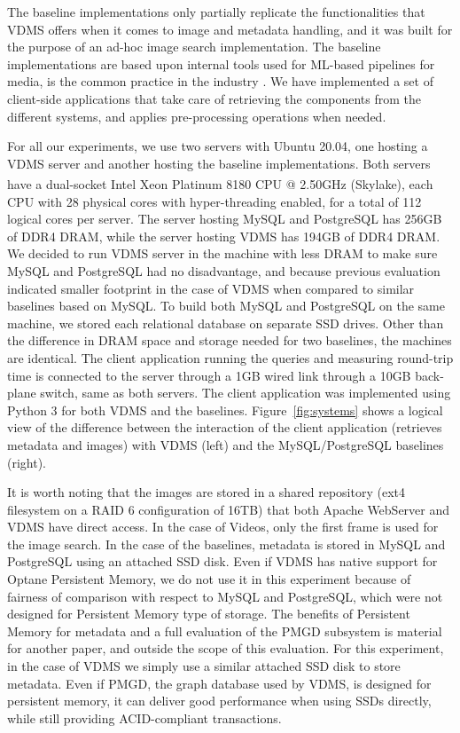 The baseline implementations only partially replicate the functionalities
that VDMS offers when it comes to image and metadata handling, and it was
built for the purpose of an ad-hoc image search implementation.
The baseline implementations are based upon internal tools used for ML-based
pipelines for media, is the common practice in the industry \cite{haystack, tao}.
We have implemented a set of client-side applications that take care
of retrieving the components from the different systems, and applies
pre-processing operations when needed.

For all our experiments, we use two servers with Ubuntu 20.04,
one hosting a VDMS server and another hosting the baseline implementations.
Both servers have a dual-socket Intel\textsuperscript{\textregistered}
Xeon\textsuperscript{\textregistered} Platinum 8180 CPU @ 2.50GHz (Skylake),
each CPU with 28 physical cores with hyper-threading enabled,
for a total of 112 logical cores per server.
The server hosting MySQL and PostgreSQL has 256GB of DDR4 DRAM,
while the server hosting VDMS has 194GB of DDR4 DRAM.
We decided to run VDMS server in the machine with less DRAM to make
sure MySQL and PostgreSQL had no disadvantage, and because previous evaluation
indicated smaller footprint in the case of VDMS when
compared to similar baselines based on MySQL.
To build both MySQL and PostgreSQL on the same machine,
we stored each relational database on separate SSD drives.
Other than the difference in DRAM space and storage needed for two baselines,
the machines are identical.
The client application running the queries and measuring round-trip time
is connected to the server through a 1GB wired link through
a 10GB back-plane switch, same as both servers.
The client application was implemented using Python 3 for both VDMS and the baselines.
Figure~\ref{fig:systems} shows a logical view of the difference between the
interaction of the client application (retrieves metadata and
images) with VDMS (left) and the MySQL/PostgreSQL baselines (right).

It is worth noting that the images are stored in a shared repository
(ext4 filesystem on a RAID 6 configuration of 16TB) that both
Apache WebServer and VDMS have direct access.
In the case of Videos, only the first frame is used for the image search.
In the case of the baselines, metadata is
stored in MySQL and PostgreSQL using an attached SSD disk.
Even if VDMS has native support for Optane Persistent Memory,
we do not use it in this experiment because of fairness of
comparison with respect to MySQL and PostgreSQL, which were not designed for
Persistent Memory type of storage.
The benefits of Persistent Memory for metadata and a full evaluation of
the PMGD subsystem is material for another paper,
and outside the scope of this evaluation.
For this experiment, in the case of VDMS we simply use a similar
attached SSD disk to store metadata.
Even if PMGD, the graph database used by VDMS, is designed for persistent memory,
it can deliver good performance when using SSDs directly, while still
providing ACID-compliant transactions.

